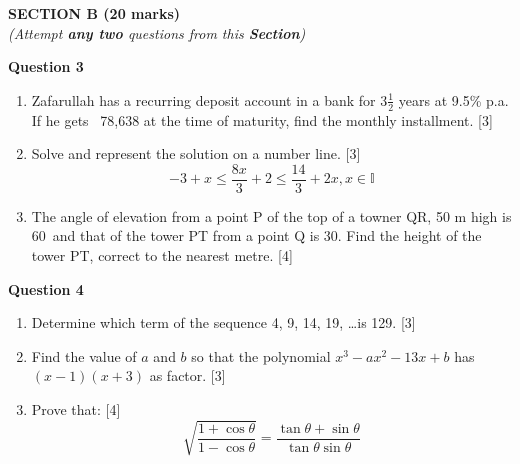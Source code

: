 \newpage
\begin{center}
   \large
   \textbf{SECTION B (20 marks)}\\
   \vspace{5mm}
   \normalsize
   \textit{(Attempt \textbf{any two} questions from this \textbf{Section})}
\end{center}
\par

\noindent
\textbf{Question 3}
\begin{enumerate}[label=(\roman*)]

    \item Zafarullah has a recurring deposit account in a bank for 
        $3\frac12$ years at 9.5\% p.a. If he gets \rupee~78,638 
        at the time of maturity, find the monthly installment. \hfill [3]

    \item Solve and represent the solution on a number line. \hfill [3]
        \[
            -3 + x \leq \frac{8x}{3} + 2 \leq \frac{14}{3} + 2x, x \in \mathbb{I}
        \]

    \item The angle of elevation from a point P of the top of 
        a towner QR, 50 m high is 60\degree \ and that of the tower
        PT from a point Q is 30\degree. Find the height of the 
        tower PT, correct to the nearest metre. \hfill [4]

\end{enumerate}

\noindent
\textbf{Question 4}
\begin{enumerate}[label=(\roman*)]

    \item Determine which term of the sequence 4, 9, 14, 19, \dots is 129. \hfill [3]

    \item Find the value of $a$ and $b$ so that the polynomial
        $x^3 - ax^2 - 13x + b$ has $(x-1)(x+3)$ as factor. \hfill [3]

    \item Prove that: \hfill [4]
        \[
            \sqrt{\frac{1 + \cos \theta}{1 - \cos \theta}} = 
            \frac{\tan \theta + \sin \theta}{\tan \theta \sin \theta}
        \]

\end{enumerate}

